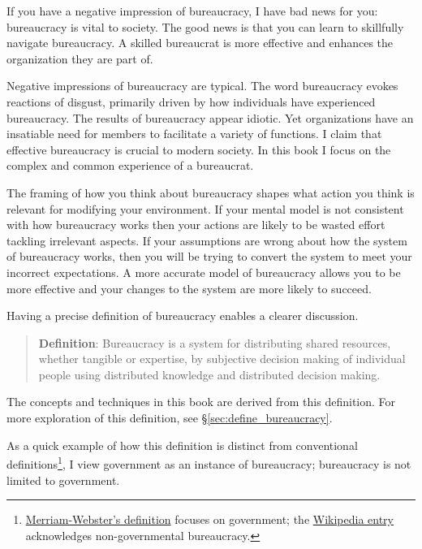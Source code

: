 

If you have a negative impression of bureaucracy, I have bad news for you: bureaucracy is vital to society. The good news is that you can learn to skillfully navigate bureaucracy. A skilled bureaucrat is more effective and enhances the organization they are part of.

Negative impressions of bureaucracy are typical. The word bureaucracy evokes reactions of disgust, primarily driven by how individuals have experienced bureaucracy. The results of bureaucracy appear idiotic. Yet organizations have an insatiable need for members to facilitate a variety of functions. I claim that effective bureaucracy is crucial to modern society. In this book I focus on the complex and common experience of a bureaucrat. 

The framing of how you think about bureaucracy shapes what action you think is relevant for modifying your environment. If your mental model is not consistent with how bureaucracy works then your actions are likely to be wasted effort tackling irrelevant aspects. If your assumptions are wrong about how the system of bureaucracy works, then you will be trying to convert the system to meet your incorrect expectations. 
A more accurate model of bureaucracy allows you to be more effective and your changes to the system are more likely to succeed. 

Having a precise definition of bureaucracy enables a clearer discussion. 

\begin{quote}
\textbf{Definition}: Bureaucracy is a system for distributing shared resources, whether tangible or expertise, by subjective decision making of individual people using distributed knowledge and distributed decision making. 
\end{quote}

The concepts and techniques in this book are derived from this definition. For more exploration of this definition, see \S\ref{sec:define_bureaucracy}.

As a quick example of how this definition is distinct from conventional definitions\footnote{\href{https://www.merriam-webster.com/dictionary/bureaucracy}{Merriam-Webster's definition} focuses on government; the \href{https://www.merriam-webster.com/dictionary/bureaucracy}{Wikipedia entry} acknowledges non-governmental bureaucracy.}, I view government as an instance of bureaucracy; bureaucracy is not limited to government. 

